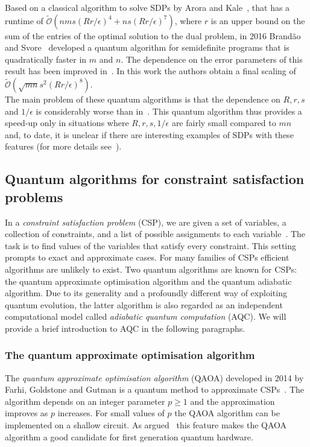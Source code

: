 \documentclass[a4paper, 11pt]{article}
\begin{document}
Based on a classical algorithm to solve SDPs by Arora and Kale~\cite{arora2007combinatorial}, that has a runtime of $\tilde{\mathcal O} (nms\left(Rr / \epsilon \right)^4+ns\left(Rr/ \epsilon \right)^7)$, where $r$ is an upper bound on the sum of the entries of the optimal solution to the dual problem, in 2016 Brand\~{a}o and Svore~\cite{brandao2016quantum} developed a quantum algorithm for semidefinite programs that is quadratically faster in $m$ and $n$. The dependence on the error parameters of this result has been improved in~\cite{van2017quantum}. In this work the authors obtain a final scaling of $\widetilde{\mathcal O}(\sqrt{mn}s^2 (Rr/\epsilon)^{8})$.\\

The main problem of these quantum algorithms is that the dependence on $R,r,s$ and $1/\epsilon$ is considerably worse than in~\cite{arora2007combinatorial}. This quantum algorithm thus provides a speed-up only in situations where $R,r,s,1/\epsilon$ are fairly small compared to $mn$ and, to date, it is unclear if there are interesting examples of SDPs with these features (for more details see~\cite{van2017quantum}).

\subsection*{Quantum algorithms for constraint satisfaction problems}

In a \textit{constraint satisfaction problem} (CSP), we are given a set of variables, a collection of constraints, and a list of possible assignments to each variable~\cite{creignou2001complexity}. The task is to find values of the variables that satisfy every constraint. This setting prompts to exact and approximate cases. For many families of CSPs efficient algorithms are unlikely to exist. Two quantum algorithms are known for CSPs: the quantum approximate optimisation algorithm and the quantum adiabatic algorithm. Due to its generality and a profoundly different way of exploiting quantum evolution, the latter algorithm is also regarded as an independent computational model called \textit{adiabatic quantum computation} (AQC). We will provide a brief introduction to AQC in the following paragraphs.
 
\subsubsection*{The quantum approximate optimisation algorithm}

The \textit{quantum approximate optimisation algorithm} (QAOA) developed in 2014 by Farhi, Goldstone and Gutman is a quantum method to approximate CSPs~\cite{farhi2014quantum}. The algorithm depends on an integer parameter $p \geq 1$ and the approximation improves as $p$ increases. For small values of $p$ the QAOA algorithm can be implemented on a shallow circuit. As argued~\cite{farhi2017quantum} this feature makes the QAOA algorithm a good candidate for first generation quantum hardware.\\
\end{document}
